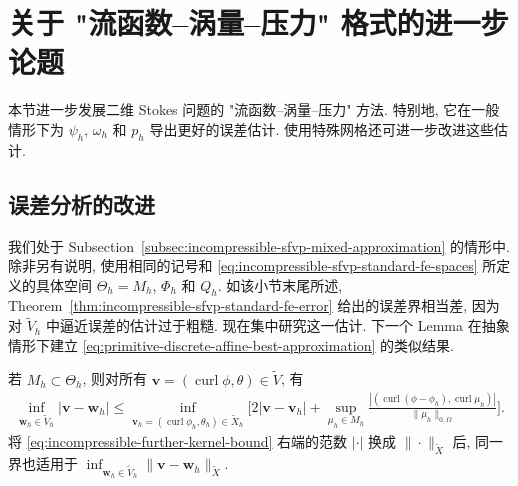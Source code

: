 \section{关于 "流函数--涡量--压力" 格式的进一步论题}
\label{sec:incompressible-further-sfvp}

本节进一步发展二维 Stokes 问题的 "流函数--涡量--压力" 方法.
特别地, 它在一般情形下为 $\psi_h$, $\omega_h$ 和 $p_h$
导出更好的误差估计. 使用特殊网格还可进一步改进这些估计.

\subsection{误差分析的改进}
\label{subsec:incompressible-further-error-refinement}

我们处于 Subsection~\ref{subsec:incompressible-sfvp-mixed-approximation}
的情形中. 除非另有说明, 使用相同的记号和
\eqref{eq:incompressible-sfvp-standard-fe-spaces}
所定义的具体空间 $\Theta_h=M_h$, $\Phi_h$ 和 $Q_h$.
如该小节末尾所述, Theorem~\ref{thm:incompressible-sfvp-standard-fe-error}
给出的误差界相当差, 因为对 $\widetilde V_h$ 中逼近误差的估计过于粗糙.
现在集中研究这一估计. 下一个 Lemma 在抽象情形下建立
\eqref{eq:primitive-discrete-affine-best-approximation} 的类似结果.

\begin{Lemma}\label{lem:incompressible-further-kernel-bound}
若 $M_h\subset\Theta_h$, 则对所有
$\mathbf v=(\operatorname{curl}\phi,\theta)\in\widetilde V$, 有
\begin{equation}\label{eq:incompressible-further-kernel-bound}
\begin{split}
\inf_{\mathbf w_h\in\widetilde V_h}|\mathbf v-\mathbf w_h|
\leq
\inf_{\mathbf v_h=(\operatorname{curl}\phi_h,\theta_h)
\in\widetilde X_h}
\biggl[2|\mathbf v-\mathbf v_h|
+\sup_{\mu_h\in M_h}
\frac{|(\operatorname{curl}(\phi-\phi_h),
\operatorname{curl}\mu_h)|}{\|\mu_h\|_{0,\Omega}}
\biggr].
\end{split}
\end{equation}
将 \eqref{eq:incompressible-further-kernel-bound} 右端的范数
$|\cdot|$ 换成 $\|\cdot\|_{\widetilde X}$ 后,
同一界也适用于
$\inf_{\mathbf w_h\in\widetilde V_h}
\|\mathbf v-\mathbf w_h\|_{\widetilde X}$.
\end{Lemma}

